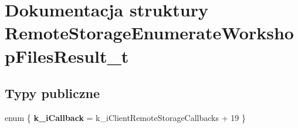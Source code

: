 \hypertarget{struct_remote_storage_enumerate_workshop_files_result__t}{}\section{Dokumentacja struktury Remote\+Storage\+Enumerate\+Workshop\+Files\+Result\+\_\+t}
\label{struct_remote_storage_enumerate_workshop_files_result__t}
\subsection*{Typy publiczne}
\begin{DoxyCompactItemize}
\item 
\mbox{\label{struct_remote_storage_enumerate_workshop_files_result__t_a5e0f816d661cbf06178a2b0077645691}} 
enum \{ {\bfseries k\+\_\+i\+Callback} = k\+\_\+i\+Client\+Remote\+Storage\+Callbacks + 19
 \}
\end{DoxyCompactItemize}
